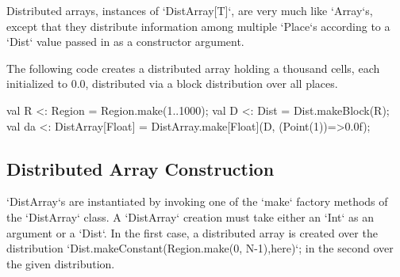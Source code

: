 Distributed arrays, instances of \xcd`DistArray[T]`, are very much like
\xcd`Array`s, except that they distribute information among multiple
\xcd`Place`s according to a \xcd`Dist` value passed in as a constructor
argument.  

\begin{ex}The following code creates a distributed array holding
a thousand cells, each initialized to 0.0, distributed via a block
distribution over all places.
\begin{xten}
val R <: Region = Region.make(1..1000);
val D <: Dist = Dist.makeBlock(R);
val da <: DistArray[Float] 
       = DistArray.make[Float](D, (Point(1))=>0.0f);
\end{xten}
\end{ex}



\subsection{Distributed Array Construction}\label{ArrayInitializer}

\xcd`DistArray`s are instantiated by invoking one of the \xcd`make` factory
methods of the \xcd`DistArray` class.
A \xcd`DistArray` creation 
must take either an \xcd`Int` as an argument or a \xcd`Dist`. In the first
case,  a distributed array is created over the distribution 
\xcd`Dist.makeConstant(Region.make(0, N-1),here)`;
in the second over the given distribution. 

